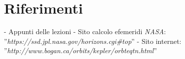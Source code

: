 \documentclass[a4paper]{article}
\begin{document}
\part{Riferimenti}
- Appunti delle lezioni \newline
- Sito calcolo efemeridi \textit{NASA}: ''\textit{https://ssd.jpl.nasa.gov/horizons.cgi\#top}''\newline
- Sito internet: ''\textit{http://www.bogan.ca/orbits/kepler/orbteqtn.html}''
\end{document}
